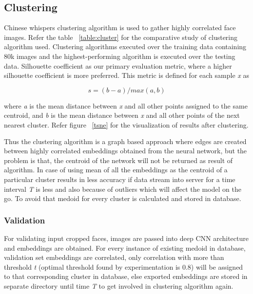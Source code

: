 \documentclass[a4paper,12pt, twoside]{NITKReport}
\begin{document}
\subsection{Clustering}
\par Chinese whispers clustering algorithm is used to gather highly correlated face images. Refer the table ~\ref{table:cluster} for the comparative study of clustering algorithm used. Clustering algorithms executed over the training data containing 80k images and the highest-performing algorithm is executed over the testing data. Silhouette coefficient as our primary evaluation metric, where a higher silhouette coefficient is more preferred. This metric is defined for each sample \textit{x} as

\begin{equation}
s = (b-a)/max(a,b)
\end{equation}

\par where \textit{a} is the mean distance between \textit{x} and all other points
assigned to the same centroid, and \textit{b} is the mean distance between \textit{x} and all other points of the next nearest cluster. Refer figure ~\ref{tsne} for the visualization of results after clustering.

\par Thus the clustering algorithm is a graph based approach where edges are created between highly correlated embeddings obtained from the neural network, but the problem is that, the centroid of the network will not be returned as result of algorithm. In case of using mean of all the embeddings as the centroid of a particular cluster results in less accuracy if data stream into server for a time interval \textit{T} is less and also because of outliers which will affect the model on the go. To avoid that medoid for every cluster is calculated and stored in database. 

\subsubsection{Validation}
For validating input cropped faces, images are passed into deep CNN architecture and embeddings are obtained. For every instance of existing medoid in database, validation set embeddings are correlated, only correlation with more than threshold 
\textit{t} (optimal threshold found by experimentation is 0.8) will be assigned to that corresponding cluster in database, else exported embeddings are stored in separate directory until time \textit{T} to get involved in clustering algorithm again. 
\end{document}
